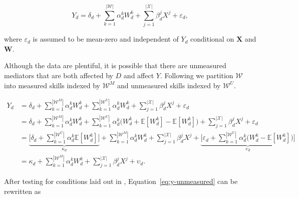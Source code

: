 \begin{equation}
\label{eq:y-mediator}
	Y_d = \delta_d +  \sum_{k=1}^{|\mathcal{W}|} \alpha_d^k W_d^k + \sum_{j = 1}^{|\mathcal{X}|} \beta_d^j X^j  + \varepsilon_d,
\end{equation}

\noindent where $\varepsilon_d$ is assumed to be mean-zero and independent of $Y_d$ conditional on $\bm{X}$ and $\bm{W}$. 


Although the data are plentiful, it is possible that there are unmeasured mediators that are both affected by $D$ and affect $Y$. Following \citet{Heckman_Pinto_etal_2013_PerryFactor} we partition $\mathcal{W}$ into measured skills indexed by $\mathcal{W}^M$ and unmeasured skills indexed by $\mathcal{W}^U$. 

\begin{align}
\label{eq:y-unmeasured}
	Y_d &= \delta_d + \sum_{k=1}^{|\mathcal{W}^M|} \alpha_d^k W_d^k + \sum_{k=1}^{|\mathcal{W}^U|} \alpha_d^k W_d^k  + \sum_{j = 1}^{|\mathcal{X}|} \beta_d^j X^j  + \varepsilon_d  \nonumber \\
	 &=  \delta_d  + \sum_{k=1}^{|\mathcal{W}^M|} \alpha_d^k W_d^k  + \sum_{k=1}^{|\mathcal{W}^U|} \alpha_d^k \Big( W_d^k + \mathbb{E}[W_d^k] - \mathbb{E}[W_d^k] \Big) + \sum_{j = 1}^{|\mathcal{X}|} \beta_d^j X^j  + \varepsilon_d  \nonumber \\
	 &= \underbrace{\bigg[ \delta_d + \sum_{k=1}^{|\mathcal{W}^U|} \alpha_d^k \mathbb{E}[W_d^k] \bigg]}_{\kappa_d} + \sum_{k=1}^{|\mathcal{W}^M|} \alpha_d^k W_d^k  + \sum_{j = 1}^{|\mathcal{X}|} \beta_d^j X^j  + \underbrace{\bigg[ \varepsilon_d + \sum_{k=1}^{|\mathcal{W}^U|} \alpha_d^k \Big( W_d^k - \mathbb{E}[W_d^k] \Big) \bigg]}_{\upsilon_d} \nonumber \\
	 &= \kappa_d + \sum_{k=1}^{|\mathcal{W}^M|} \alpha_d^k W_d^k  + \sum_{j = 1}^{|\mathcal{X}|} \beta_d^j X^j + \upsilon_d.
\end{align}


After testing for conditions laid out in \citet{Heckman_Pinto_etal_2013_PerryFactor}, Equation~\eqref{eq:y-unmeasured} can be rewritten as


